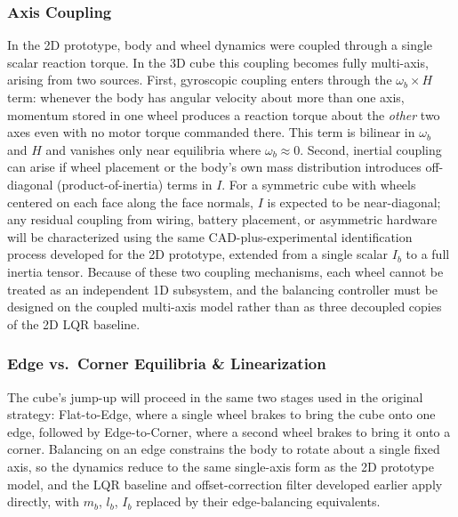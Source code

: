 \subsubsection{Axis Coupling}
In the 2D prototype, body and wheel dynamics were coupled through a single scalar reaction torque. In the 3D cube this coupling becomes fully multi-axis, arising from two sources. First, gyroscopic coupling enters through the $\omega_b \times H$ term: whenever the body has angular velocity about more than one axis, momentum stored in one wheel produces a reaction torque about the \emph{other} two axes even with no motor torque commanded there. This term is bilinear in $\omega_b$ and $H$ and vanishes only near equilibria where $\omega_b\approx 0$. Second, inertial coupling can arise if wheel placement or the body's own mass distribution introduces off-diagonal (product-of-inertia) terms in $I$. For a symmetric cube with wheels centered on each face along the face normals, $I$ is expected to be near-diagonal; any residual coupling from wiring, battery placement, or asymmetric hardware will be characterized using the same CAD-plus-experimental identification process developed for the 2D prototype, extended from a single scalar $I_b$ to a full inertia tensor. Because of these two coupling mechanisms, each wheel cannot be treated as an independent 1D subsystem, and the balancing controller must be designed on the coupled multi-axis model rather than as three decoupled copies of the 2D LQR baseline.
\newpage

\subsubsection{Edge vs.\ Corner Equilibria \& Linearization}

The cube's jump-up will proceed in the same two stages used in the original strategy: Flat-to-Edge, where a single wheel brakes to bring the cube onto one edge, followed by Edge-to-Corner, where a second wheel brakes to bring it onto a corner. Balancing on an edge constrains the body to rotate about a single fixed axis, so the dynamics reduce to the same single-axis form as the 2D prototype model, and the LQR baseline and offset-correction filter developed earlier apply directly, with $m_b$, $l_b$, $I_b$ replaced by their edge-balancing equivalents.

